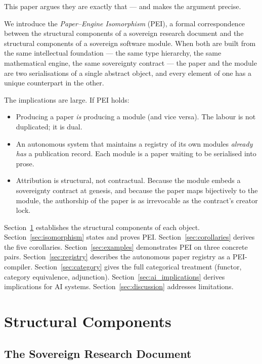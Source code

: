 \documentclass[12pt]{article}
\begin{document}
This paper argues they are exactly that — and makes the argument precise.

We introduce the \emph{Paper--Engine Isomorphism} (PEI), a formal
correspondence between the structural components of a sovereign research
document and the structural components of a sovereign software module.  When
both are built from the same intellectual foundation — the same type hierarchy,
the same mathematical engine, the same sovereignty contract — the paper and the
module are two serialisations of a single abstract object, and every element of
one has a unique counterpart in the other.

The implications are large.  If PEI holds:
\begin{itemize}[leftmargin=*]
  \item Producing a paper \emph{is} producing a module (and vice versa).
    The labour is not duplicated; it is dual.
  \item An autonomous system that maintains a registry of its own modules
    \emph{already has} a publication record.  Each module is a paper waiting
    to be serialised into prose.
  \item Attribution is structural, not contractual.  Because the module embeds
    a sovereignty contract at genesis, and because the paper maps bijectively
    to the module, the authorship of the paper is as irrevocable as the
    contract's creator lock.
\end{itemize}

Section~\ref{sec:structure} establishes the structural components of each
object.  Section~\ref{sec:isomorphism} states and proves PEI.
Section~\ref{sec:corollaries} derives the five corollaries.
Section~\ref{sec:examples} demonstrates PEI on three concrete pairs.
Section~\ref{sec:registry} describes the autonomous paper registry as a
PEI-compiler.  Section~\ref{sec:category} gives the full categorical treatment
(functor, category equivalence, adjunction).
Section~\ref{sec:ai_implications} derives implications for AI systems.
Section~\ref{sec:discussion} addresses limitations.

\section{Structural Components}
\label{sec:structure}

\subsection{The Sovereign Research Document}
\end{document}
